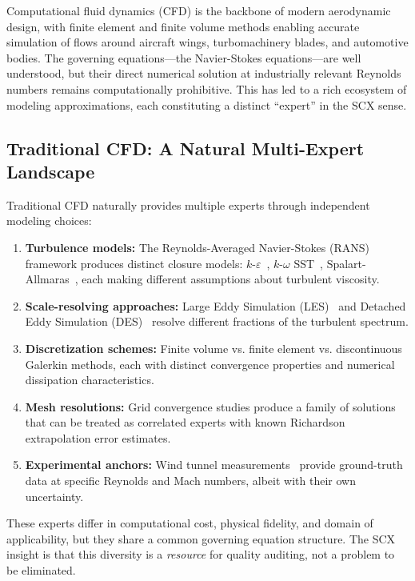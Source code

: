 \documentclass[11pt,a4paper]{article}
\theoremstyle{definition}
\theoremstyle{remark}
\begin{document}
Computational fluid dynamics (CFD) is the backbone of modern aerodynamic design, with finite element and finite volume methods enabling accurate simulation of flows around aircraft wings, turbomachinery blades, and automotive bodies.
The governing equations---the Navier-Stokes equations---are well understood, but their direct numerical solution at industrially relevant Reynolds numbers remains computationally prohibitive.
This has led to a rich ecosystem of modeling approximations, each constituting a distinct ``expert'' in the SCX sense.

\subsection{Traditional CFD: A Natural Multi-Expert Landscape}

Traditional CFD naturally provides multiple experts through independent modeling choices:

\begin{enumerate}[label=(\roman*)]
    \item \textbf{Turbulence models:} The Reynolds-Averaged Navier-Stokes (RANS) framework produces distinct closure models: $k$-$\varepsilon$~\citep{launder1974numerical}, $k$-$\omega$ SST~\citep{menter1994two}, Spalart-Allmaras~\citep{spalart1992one}, each making different assumptions about turbulent viscosity.
    \item \textbf{Scale-resolving approaches:} Large Eddy Simulation (LES)~\citep{smagorinsky1963general} and Detached Eddy Simulation (DES)~\citep{spalart1997comments} resolve different fractions of the turbulent spectrum.
    \item \textbf{Discretization schemes:} Finite volume vs. finite element vs. discontinuous Galerkin methods, each with distinct convergence properties and numerical dissipation characteristics.
    \item \textbf{Mesh resolutions:} Grid convergence studies produce a family of solutions that can be treated as correlated experts with known Richardson extrapolation error estimates.
    \item \textbf{Experimental anchors:} Wind tunnel measurements~\citep{ladson1988acquired,schmitt2007advanced} provide ground-truth data at specific Reynolds and Mach numbers, albeit with their own uncertainty.
\end{enumerate}

These experts differ in computational cost, physical fidelity, and domain of applicability, but they share a common governing equation structure.
The SCX insight is that this diversity is a \emph{resource} for quality auditing, not a problem to be eliminated.
\end{document}
